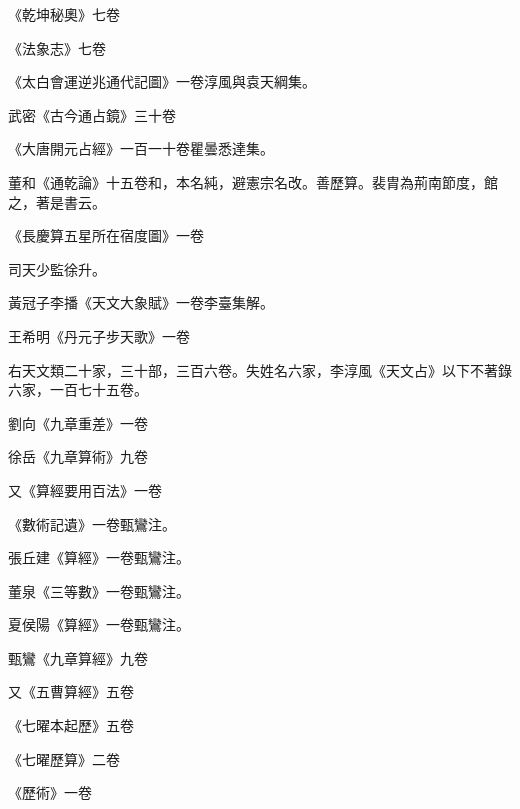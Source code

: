 \begin{pinyinscope}
 《乾坤秘奧》七卷



 《法象志》七卷



 《太白會運逆兆通代記圖》一卷淳風與袁天綱集。



 武密《古今通占鏡》三十卷



 《大唐開元占經》一百一十卷瞿曇悉達集。



 董和《通乾論》十五卷和，本名純，避憲宗名改。善歷算。裴胄為荊南節度，館之，著是書云。



 《長慶算五星所在宿度圖》一卷



 司天少監徐升。



 黃冠子李播《天文大象賦》一卷李臺集解。



 王希明《丹元子步天歌》一卷



 右天文類二十家，三十部，三百六卷。失姓名六家，李淳風《天文占》以下不著錄六家，一百七十五卷。



 劉向《九章重差》一卷



 徐岳《九章算術》九卷



 又《算經要用百法》一卷



 《數術記遺》一卷甄鸞注。



 張丘建《算經》一卷甄鸞注。



 董泉《三等數》一卷甄鸞注。



 夏侯陽《算經》一卷甄鸞注。



 甄鸞《九章算經》九卷



 又《五曹算經》五卷



 《七曜本起歷》五卷



 《七曜歷算》二卷



 《歷術》一卷




\end{pinyinscope}
